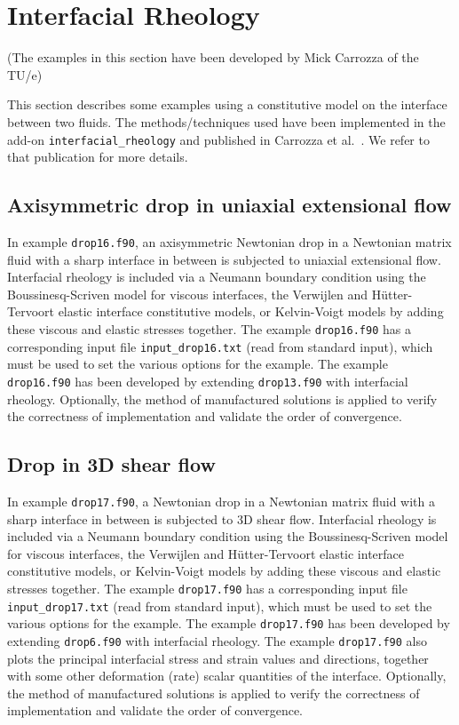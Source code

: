 
\def\headdate{17th February 2021}

\section{Interfacial Rheology}
\label{sec:interfacial_rheology}

(The examples in this section have been developed by Mick
 Carrozza of the TU/e)\medskip

This section describes some examples using a constitutive model on the
interface between two fluids. The methods/techniques
 used have been implemented in the add-on
\texttt{interfacial\_rheology} and published in Carrozza et al.\
\cite{Carrozza2020}. We refer to that publication for more details.

\subsection{Axisymmetric drop in uniaxial extensional flow}

In example \texttt{drop16.f90}, an axisymmetric Newtonian drop
in a Newtonian matrix fluid with a sharp interface in between is subjected to
uniaxial extensional flow. Interfacial rheology is included via a Neumann
boundary condition using the Boussinesq-Scriven model for viscous interfaces,
the Verwijlen and H\"utter-Tervoort elastic interface constitutive models, or
Kelvin-Voigt models by adding these viscous and elastic stresses together.
The example \texttt{drop16.f90} has a corresponding input file
\texttt{input\_drop16.txt} (read from standard input), which
must be used to set the various options for the example. The example
\texttt{drop16.f90} has been developed by extending
\texttt{drop13.f90} with interfacial rheology. Optionally, the method of
manufactured solutions is applied to verify the correctness of implementation
and validate the order of convergence. 

\subsection{Drop in 3D shear flow}

In example \texttt{drop17.f90}, a Newtonian drop in a 
Newtonian matrix fluid with a sharp interface in between is subjected to 3D
shear flow. Interfacial rheology is included via a Neumann boundary condition
using the Boussinesq-Scriven model for viscous interfaces, the Verwijlen and
H\"utter-Tervoort elastic interface constitutive models, or Kelvin-Voigt models
by adding these viscous and elastic stresses together. The example
\texttt{drop17.f90} has a corresponding input file
\texttt{input\_drop17.txt} (read from standard input), which
must be used to set the various options for the example. The example
\texttt{drop17.f90} has been developed by extending
\texttt{drop6.f90} with interfacial rheology. The example
\texttt{drop17.f90} also plots the principal interfacial stress
and strain values and directions, together with some other deformation (rate)
scalar quantities of the interface. Optionally, the method of manufactured
solutions is applied to verify the correctness of implementation and validate
the order of convergence. 

